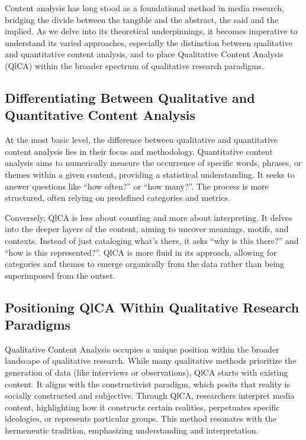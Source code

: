 \documentclass[
  b5paper]{book}
\begin{document}
Content analysis has long stood as a foundational method in media research, bridging the divide between the tangible and the abstract, the said and the implied. As we delve into its theoretical underpinnings, it becomes imperative to understand its varied approaches, especially the distinction between qualitative and quantitative content analysis, and to place Qualitative Content Analysis (QlCA) within the broader spectrum of qualitative research paradigms.

\hypertarget{differentiating-between-qualitative-and-quantitative-content-analysis}{%
\subsection*{Differentiating Between Qualitative and Quantitative Content Analysis}\label{differentiating-between-qualitative-and-quantitative-content-analysis}}

At the most basic level, the difference between qualitative and quantitative content analysis lies in their focus and methodology. Quantitative content analysis aims to numerically measure the occurrence of specific words, phrases, or themes within a given content, providing a statistical understanding. It seeks to answer questions like ``how often?'' or ``how many?''. The process is more structured, often relying on predefined categories and metrics.

Conversely, QlCA is less about counting and more about interpreting. It delves into the deeper layers of the content, aiming to uncover meanings, motifs, and contexts. Instead of just cataloging what's there, it asks ``why is this there?'' and ``how is this represented?''. QlCA is more fluid in its approach, allowing for categories and themes to emerge organically from the data rather than being superimposed from the outset.

\hypertarget{positioning-qlca-within-qualitative-research-paradigms}{%
\subsection*{Positioning QlCA Within Qualitative Research Paradigms}\label{positioning-qlca-within-qualitative-research-paradigms}}

Qualitative Content Analysis occupies a unique position within the broader landscape of qualitative research. While many qualitative methods prioritize the generation of data (like interviews or observations), QlCA starts with existing content. It aligns with the constructivist paradigm, which posits that reality is socially constructed and subjective. Through QlCA, researchers interpret media content, highlighting how it constructs certain realities, perpetuates specific ideologies, or represents particular groups. This method resonates with the hermeneutic tradition, emphasizing understanding and interpretation.
\end{document}
